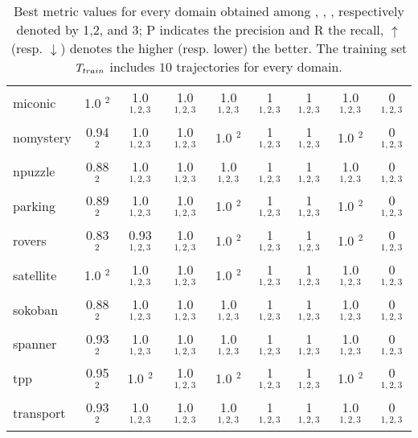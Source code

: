 \begin{table}[h]
{\begin{tabular}{l|c|c|c|c|c|c|c|c}
miconic  & 1.0 $^{2}$ & 1.0 $^{1,2,3}$ & 1.0 $^{1,2,3}$ & 1.0 $^{1,2,3}$ & 1 $^{1,2,3}$ & 1 $^{1,2,3}$ & 1.0 $^{1,2,3}$ & 0 $^{1,2,3}$ \\
nomystery  & 0.94 $^{2}$ & 1.0 $^{1,2,3}$ & 1.0 $^{1,2,3}$ & 1.0 $^{2}$ & 1 $^{1,2,3}$ & 1 $^{1,2,3}$ & 1.0 $^{2}$ & 0 $^{1,2,3}$ \\
npuzzle  & 0.88 $^{2}$ & 1.0 $^{1,2,3}$ & 1.0 $^{1,2,3}$ & 1.0 $^{1,2,3}$ & 1 $^{1,2,3}$ & 1 $^{1,2,3}$ & 1.0 $^{1,2,3}$ & 0 $^{1,2,3}$ \\
parking  & 0.89 $^{2}$ & 1.0 $^{1,2,3}$ & 1.0 $^{1,2,3}$ & 1.0 $^{2}$ & 1 $^{1,2,3}$ & 1 $^{1,2,3}$ & 1.0 $^{2}$ & 0 $^{1,2,3}$ \\
rovers  & 0.83 $^{2}$ & 0.93 $^{1,2,3}$ & 1.0 $^{1,2,3}$ & 1.0 $^{2}$ & 1 $^{1,2,3}$ & 1 $^{1,2,3}$ & 1.0 $^{2}$ & 0 $^{1,2,3}$ \\
satellite  & 1.0 $^{2}$ & 1.0 $^{1,2,3}$ & 1.0 $^{1,2,3}$ & 1.0 $^{2}$ & 1 $^{1,2,3}$ & 1 $^{1,2,3}$ & 1.0 $^{1,2,3}$ & 0 $^{1,2,3}$ \\
sokoban  & 0.88 $^{2}$ & 1.0 $^{1,2,3}$ & 1.0 $^{1,2,3}$ & 1.0 $^{1,2,3}$ & 1 $^{1,2,3}$ & 1 $^{1,2,3}$ & 1.0 $^{1,2,3}$ & 0 $^{1,2,3}$ \\
spanner  & 0.93 $^{2}$ & 1.0 $^{1,2,3}$ & 1.0 $^{1,2,3}$ & 1.0 $^{1,2,3}$ & 1 $^{1,2,3}$ & 1 $^{1,2,3}$ & 1.0 $^{1,2,3}$ & 0 $^{1,2,3}$ \\
tpp  & 0.95 $^{2}$ & 1.0 $^{2}$ & 1.0 $^{1,2,3}$ & 1.0 $^{2}$ & 1 $^{1,2,3}$ & 1 $^{1,2,3}$ & 1.0 $^{2}$ & 0 $^{1,2,3}$ \\
transport  & 0.93 $^{2}$ & 1.0 $^{1,2,3}$ & 1.0 $^{1,2,3}$ & 1.0 $^{1,2,3}$ & 1 $^{1,2,3}$ & 1 $^{1,2,3}$ & 1.0 $^{1,2,3}$ & 0 $^{1,2,3}$ \\
\hline
\end{tabular}
}
\caption{Best metric values for every domain obtained among \sam, \offlam, \nolam, respectively denoted by 1,2, and 3; P indicates the precision and R the recall, $\uparrow$ (resp. $\downarrow$) denotes the higher (resp. lower) the better. The training set $T_{train}$ includes $10$ trajectories for every domain.}
\end{table}